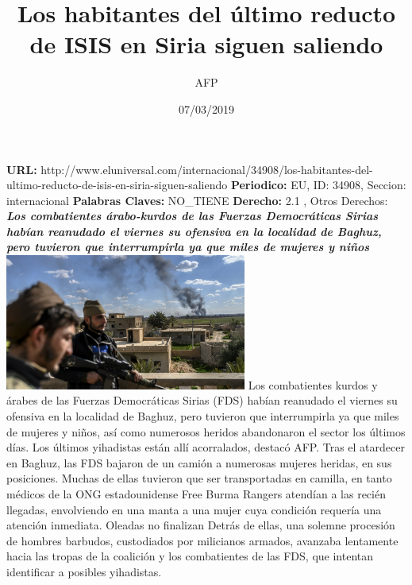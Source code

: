 \documentclass{article}%
\title{\textbf{Los habitantes del último reducto de ISIS en Siria siguen saliendo}}%
\author{AFP}%
\date{07/03/2019}%
\begin{document}
%
\normalsize%
\maketitle%
\textbf{URL: }%
http://www.eluniversal.com/internacional/34908/los{-}habitantes{-}del{-}ultimo{-}reducto{-}de{-}isis{-}en{-}siria{-}siguen{-}saliendo\newline%
%
\textbf{Periodico: }%
EU, %
ID: %
34908, %
Seccion: %
internacional\newline%
%
\textbf{Palabras Claves: }%
NO\_TIENE\newline%
%
\textbf{Derecho: }%
2.1%
, Otros Derechos: %
\newline%
%
\textbf{\textit{Los combatientes árabo{-}kurdos de las Fuerzas Democráticas Sirias habían reanudado el viernes su ofensiva en la localidad de Baghuz, pero tuvieron que interrumpirla ya que miles de mujeres y niños}}%
\newline%
\newline%
%
\includegraphics[width=300px]{EU_34908.jpg}%
\newline%
%
Los combatientes kurdos y árabes de las Fuerzas Democráticas Sirias (FDS) habían reanudado el viernes su ofensiva en la localidad de Baghuz, pero tuvieron que interrumpirla ya que miles de mujeres y niños, así como numerosos heridos abandonaron el sector los últimos días. Los últimos yihadistas están allí acorralados, destacó AFP.%
\newline%
%
Tras el atardecer en Baghuz, las FDS bajaron de un camión a numerosas mujeres heridas, en sus posiciones.%
\newline%
%
Muchas de ellas tuvieron que ser transportadas en camilla, en tanto médicos de la ONG estadounidense Free Burma Rangers atendían a las recién llegadas, envolviendo en una manta a una mujer cuya condición requería una atención inmediata.%
\newline%
%
Oleadas no finalizan%
\newline%
%
Detrás de ellas, una solemne procesión de hombres barbudos, custodiados por milicianos armados, avanzaba lentamente hacia las tropas de la coalición y los combatientes de las FDS, que intentan identificar a posibles yihadistas.%
\end{document}

